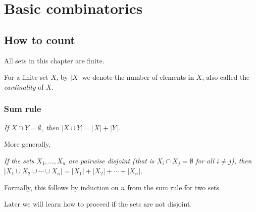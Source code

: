 


\begin{page}
\setcounter{section}{1}
\setcounter{subsection}{0}
\setcounter{dfn}{0}
\label{portion:2}

\chapter{Basic combinatorics}


\end{page}

\begin{page}
\setcounter{section}{1}
\setcounter{subsection}{1}
\setcounter{dfn}{0}
\label{portion:4}

\section{How to count}
All sets in this chapter are finite.

For a finite set $X$, by $|X|$ we denote the number of elements in $X$, also called the \emph{cardinality} of $X$.


\end{page}

\begin{page}
\setcounter{section}{1}
\setcounter{subsection}{2}
\setcounter{dfn}{0}
\label{portion:6}

\subsection{Sum rule}
\begin{center}
\emph{If $X \cap Y = \emptyset$, then $|X \cup Y| = |X| + |Y|$.}
\end{center}

More generally,
\begin{center}
\parbox{.9\textwidth}{\emph{If the sets $X_1, \ldots, X_n$ are pairwise disjoint
(that is $X_i \cap X_j = \emptyset$ for all $i \ne j$),
then $|X_1 \cup X_2 \cup \cdots \cup X_n| = |X_1| + |X_2| + \cdots + |X_n|$.}}
\end{center}
Formally, this follows by induction on $n$ from the sum rule for two sets.

Later we will learn how to proceed if the sets are not disjoint.


\end{page}

